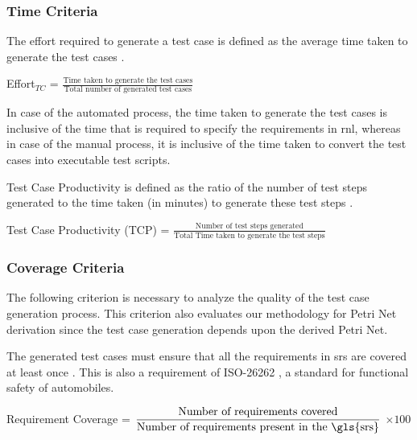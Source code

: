 \subsubsection{\textbf{Time Criteria}} 

\begin{definition}
\label{def:def5}

The effort required to generate a test case is defined as the average time taken to generate the test cases \cite{elghondakly2015waterfall}.

Effort$_{TC}$   = $\displaystyle\frac{\mbox{Time taken to generate the test cases}}{\mbox{Total number of generated test cases}}$

In case of the automated process, the time taken to generate the test cases is inclusive of the time that is required to specify the requirements in \gls{rnl}, whereas in case of the manual process, it is inclusive of the time taken to convert the test cases into executable test scripts.
\end{definition}

\begin{definition}
\label{def:def6}

Test Case Productivity is defined as the ratio of the number of test steps generated to the time taken (in minutes) to generate these test steps \cite{gulechha2009software}.

Test Case Productivity (TCP)   = $\displaystyle\frac{\mbox{Number of test steps generated}}{\mbox{Total Time taken to generate the test steps}}$
\end{definition}

\subsubsection{\textbf{Coverage Criteria}}
The following criterion is necessary to analyze the quality of the test case generation process. This criterion also evaluates our methodology for Petri Net derivation since the test case generation depends upon the derived Petri Net.

\begin{definition}
\label{def:def7}

The generated test cases must ensure that all the requirements in \gls{srs} are covered at least once \cite{iso2013iso}. This is also a requirement of ISO-26262 \cite{iso201126262}, a standard for functional safety of automobiles.

Requirement Coverage = $\displaystyle\frac{\mbox{Number of requirements covered}}{\mbox{Number of requirements present in the \gls{srs}}}$  $\times 100$
\end{definition}

